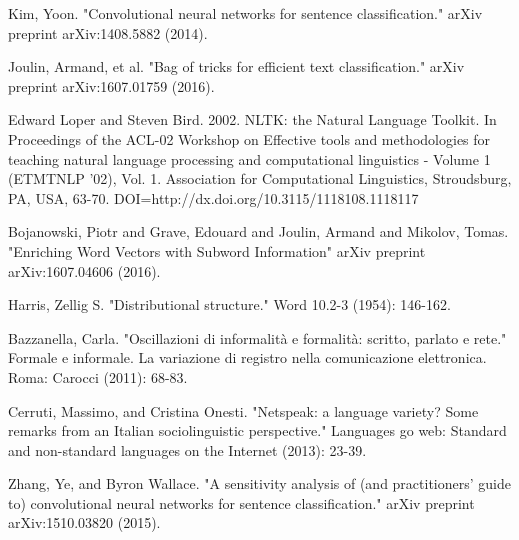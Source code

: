 \begin{thebibliography}{1}

Kim, Yoon. "Convolutional neural networks for sentence classification." arXiv preprint arXiv:1408.5882 (2014).

Joulin, Armand, et al. "Bag of tricks for efficient text classification." arXiv preprint arXiv:1607.01759 (2016).

Edward Loper and Steven Bird. 2002. NLTK: the Natural Language Toolkit. In Proceedings of the ACL-02 Workshop on Effective tools and methodologies for teaching natural language processing and computational linguistics - Volume 1 (ETMTNLP '02), Vol. 1. Association for Computational Linguistics, Stroudsburg, PA, USA, 63-70. DOI=http://dx.doi.org/10.3115/1118108.1118117


Bojanowski, Piotr and Grave, Edouard and Joulin, Armand and Mikolov, Tomas. "Enriching Word Vectors with Subword Information" arXiv preprint arXiv:1607.04606 (2016).

Harris, Zellig S. "Distributional structure." Word 10.2-3 (1954): 146-162.

Bazzanella, Carla. "Oscillazioni di informalità e formalità: scritto, parlato e rete." Formale e informale. La variazione di registro nella comunicazione elettronica. Roma: Carocci (2011): 68-83.

Cerruti, Massimo, and Cristina Onesti. "Netspeak: a language variety? Some remarks from an Italian sociolinguistic perspective." Languages go web: Standard and non-standard languages on the Internet (2013): 23-39.

Zhang, Ye, and Byron Wallace. "A sensitivity analysis of (and practitioners' guide to) convolutional neural networks for sentence classification." arXiv preprint arXiv:1510.03820 (2015).

\end{thebibliography}